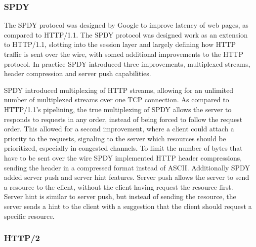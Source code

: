 \documentclass[english, 12pt, a4paper, elec, utf8, a-2b, online]{aaltothesis}
\begin{document}
\subsubsection{SPDY}

The SPDY protocol was designed by Google to improve latency of web pages, as compared
to HTTP/1.1. The SPDY protocol was designed work as an extension to HTTP/1.1,
slotting into the session layer and largely defining how HTTP traffic is sent over the
wire, with somed additional improvements to the HTTP protocol. In practice SPDY
introduced three improvements, multiplexed streams, header compression and server push capabilities\cite{spdy}.

SPDY introduced multiplexing of HTTP streams, allowing for an unlimited number
of multiplexed streams over one TCP connection. As compared to HTTP/1.1's pipelining,
the true multiplexing of SPDY allows the server to responds to requests in any order,
instead of being forced to follow the request order. This allowed for a second improvement,
where a client could attach a priority to the requests, signaling to the server
which resources should be prioritized, especially in congested channels. To limit
the number of bytes that have to be sent over the wire SPDY implemented HTTP header
compressions, sending the header in a compressed format instead of ASCII. Additionally
SPDY added server push and server hint features. Server push allows the server to
send a resource to the client, without the client having request the resource first.
Server hint is similar to server push, but instead of sending the resource, the
server sends a hint to the client with a suggestion that the client should request
a specific resource\cite{spdy}.
\subsubsection{HTTP/2}
\end{document}

